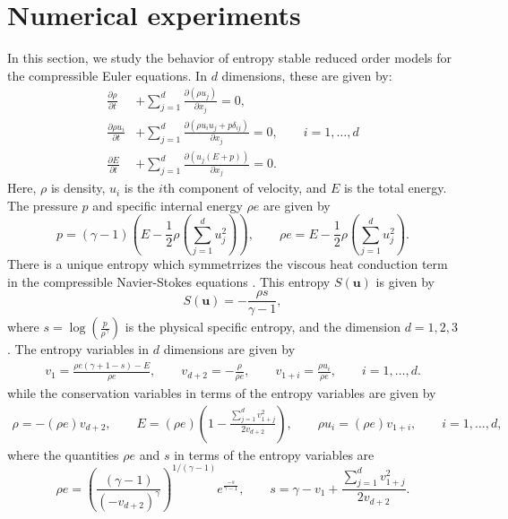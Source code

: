 \documentclass[preprint,10pt]{elsarticle}
\theoremstyle{definition}
\theoremstyle{lemma}
\theoremstyle{theorem}
\theoremstyle{assumption}
\newcommand{\pd}[2]{\frac{\partial#1}{\partial#2}}
\newcommand{\LRp}[1]{\left( #1 \right)}
\begin{document}
\section{Numerical experiments}
\label{sec:8}
{In this section, we study the behavior of entropy stable reduced order models for} the compressible Euler equations.  In $d$ dimensions, these are given by:
\begin{align*}
\pd{\rho}{t} &+ {\sum_{j=1}^d \pd{\LRp{\rho {u}_j}}{x_j}} = 0,\\
{\pd{\rho {u}_i}{t}} &+ {\sum_{j=1}^d \pd{\LRp{\rho u_iu_j + p\delta_{ij} }}{x_j}} = 0, \qquad i = 1,\ldots,d\\
\pd{E}{t} &+ {\sum_{j=1}^d \pd{\LRp{{u}_j(E+p)}}{x_j}} = 0.\nonumber
\end{align*}
Here, $\rho$ is density, {$u_i$ is the $i$th component of} velocity, and $E$ is the total energy.  The pressure $p$ and specific internal energy $\rho e$ are given by 
\[
{p = (\gamma-1)\LRp{E - \frac{1}{2}\rho \LRp{\sum_{j=1}^d u_j^2}}}, \qquad {\rho e = E - \frac{1}{2}\rho \LRp{\sum_{j=1}^d u_j^2}}. 
\]
There is a unique entropy which symmetrrizes the viscous heat conduction term in the compressible Navier-Stokes equations \cite{hughes1986new}.  This entropy $S(\bm{u})$ is given by
\begin{equation*}
S(\bm{u}) = -\frac{\rho s}{\gamma-1}, 
\end{equation*}
where $s = \log\LRp{\frac{p}{\rho^\gamma}}$ is the physical specific entropy, and the dimension $d = 1,2,3$.  The entropy variables in $d$ dimensions are given by
\begin{gather*}
v_1 = \frac{\rho e (\gamma + 1 - s) - E}{\rho e}, \qquad v_{d+2} = -\frac{\rho}{\rho e}, \qquad
v_{1+ i}= \frac{\rho {{u}_i}}{\rho e}, \qquad i = 1,\ldots, d.
\end{gather*}
while the conservation variables in terms of the entropy variables are given by
\begin{gather*}
\rho = -(\rho e) v_{d+2}, \qquad E = (\rho e)\LRp{1 - \frac{\sum_{j=1}^d{v_{1+j}^2}}{2 v_{d+2}}}, \qquad
 \rho {u_i} = (\rho e) v_{1+i}, \qquad i = 1,\ldots,d,
\end{gather*}
where the quantities $\rho e$ and $s$ in terms of the entropy variables are 
\begin{equation*}
\rho e = \LRp{\frac{(\gamma-1)}{\LRp{-v_{d+2}}^{\gamma}}}^{1/(\gamma-1)}e^{\frac{-s}{\gamma-1}}, \qquad s = \gamma - v_1 + \frac{\sum_{j=1}^d{v_{1+j}^2}}{2v_{d+2}}.
\end{equation*}
\end{document}

